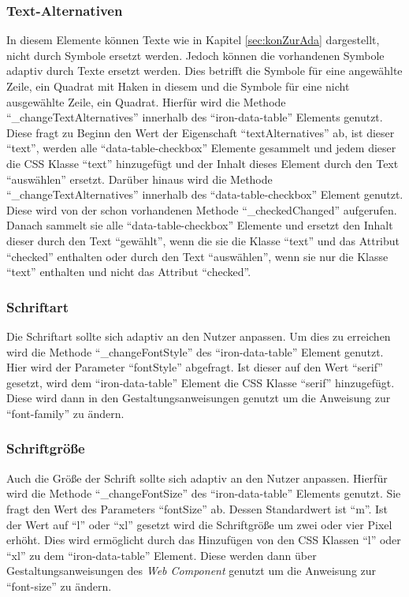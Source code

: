 \documentclass[12pt, paper=a4, bibtotoc, toc=listof, headsepline=true, numbers=endperiod]{scrreprt}
\begin{document}
	\subsubsection{Text-Alternativen}
	In diesem Elemente können Texte wie in Kapitel \ref{sec:konZurAda} dargestellt, nicht durch Symbole ersetzt werden. Jedoch können die vorhandenen Symbole adaptiv durch Texte ersetzt werden. Dies betrifft die Symbole für eine angewählte Zeile, ein Quadrat mit Haken in diesem und die Symbole für eine nicht ausgewählte Zeile, ein Quadrat. Hierfür wird die Methode \enquote{\_changeTextAlternatives} innerhalb des \enquote{iron-data-table} Elements genutzt. Diese fragt zu Beginn den Wert der Eigenschaft \enquote{textAlternatives} ab, ist dieser \enquote{text}, werden alle \enquote{data-table-checkbox} Elemente gesammelt und jedem dieser die CSS Klasse \enquote{text} hinzugefügt und der Inhalt dieses Element durch den Text \enquote{auswählen} ersetzt. Darüber hinaus wird die Methode \enquote{\_changeTextAlternatives} innerhalb des \enquote{data-table-checkbox} Element genutzt. Diese wird von der schon vorhandenen Methode \enquote{\_checkedChanged} aufgerufen. Danach sammelt sie alle \enquote{data-table-checkbox} Elemente und ersetzt den Inhalt dieser durch den Text \enquote{gewählt}, wenn die sie die Klasse \enquote{text} und das Attribut \enquote{checked} enthalten oder durch den Text \enquote{auswählen}, wenn sie nur die Klasse \enquote{text} enthalten und nicht das Attribut \enquote{checked}.
	\subsubsection{Schriftart}
	Die Schriftart sollte sich adaptiv an den Nutzer anpassen. Um dies zu erreichen wird die Methode \enquote{\_changeFontStyle} des \enquote{iron-data-table} Element genutzt. Hier wird der Parameter \enquote{fontStyle} abgefragt. Ist dieser auf den Wert \enquote{serif} gesetzt, wird dem \enquote{iron-data-table} Element die CSS Klasse \enquote{serif} hinzugefügt. Diese wird dann in den Gestaltungsanweisungen genutzt um die Anweisung zur \enquote{font-family} zu ändern.
	\subsubsection{Schriftgröße}
	Auch die Größe der Schrift sollte sich adaptiv an den Nutzer anpassen. Hierfür wird die Methode \enquote{\_changeFontSize} des \enquote{iron-data-table} Elements genutzt. Sie fragt den Wert des Parameters \enquote{fontSize} ab. Dessen Standardwert ist \enquote{m}. Ist der Wert auf \enquote{l} oder \enquote{xl} gesetzt wird die Schriftgröße um zwei oder vier Pixel erhöht. Dies wird ermöglicht durch das Hinzufügen von den CSS Klassen \enquote{l} oder \enquote{xl} zu dem \enquote{iron-data-table} Element. Diese werden dann über Gestaltungsanweisungen des \emph{Web Component} genutzt um die Anweisung zur \enquote{font-size} zu ändern.
\end{document}
